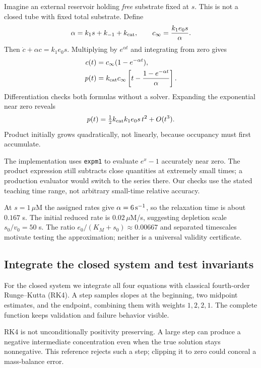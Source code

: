 Imagine an external reservoir holding \emph{free} substrate fixed at $s$. This is not a closed tube with fixed total substrate. Define
\begin{equation}
\alpha=k_1s+k_{-1}+k_{\rm cat},\qquad
c_\infty=\frac{k_1e_0s}{\alpha}.
\end{equation}
Then $\dot c+\alpha c=k_1e_0s$. Multiplying by $e^{\alpha t}$ and integrating from zero gives
\begin{align}
c(t)&=c_\infty(1-e^{-\alpha t}),\\
p(t)&=k_{\rm cat}c_\infty
\left[t-\frac{1-e^{-\alpha t}}{\alpha}\right].
\label{eq:clamped}
\end{align}
Differentiation checks both formulas without a solver. Expanding the exponential near zero reveals
\begin{equation}
p(t)=\tfrac12 k_{\rm cat}k_1e_0s\,t^2+O(t^3).
\end{equation}
Product initially grows quadratically, not linearly, because occupancy must first accumulate.


The implementation uses \texttt{expm1} to evaluate $e^x-1$ accurately near zero. The product expression still subtracts close quantities at extremely small times; a production evaluator would switch to the series there. Our checks use the stated teaching time range, not arbitrary small-time relative accuracy.

At $s=1\,\mu$M the assigned rates give $\alpha=6\,{\rm s}^{-1}$, so the relaxation time is about $0.167$ s. The initial reduced rate is $0.02\,\mu$M/s, suggesting depletion scale $s_0/v_0=50$ s. The ratio $e_0/(K_M+s_0)\approx0.00667$ and separated timescales motivate testing the approximation; neither is a universal validity certificate.

\subsection{Integrate the closed system and test invariants}

For the closed system we integrate all four equations with classical fourth-order Runge--Kutta (RK4). A step samples slopes at the beginning, two midpoint estimates, and the endpoint, combining them with weights $1,2,2,1$. The complete function keeps validation and failure behavior visible.


RK4 is not unconditionally positivity preserving. A large step can produce a negative intermediate concentration even when the true solution stays nonnegative. This reference rejects such a step; clipping it to zero could conceal a mass-balance error.

